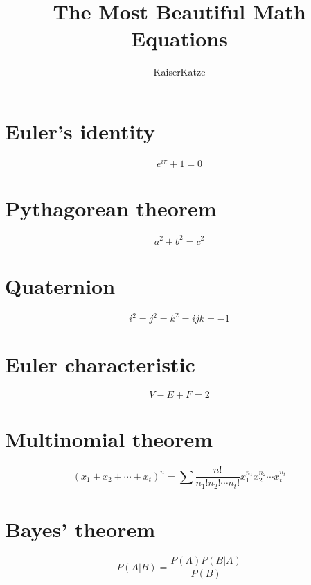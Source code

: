 \documentclass[12pt,twoside]{article}
\title{The Most Beautiful Math Equations}
\author{KaiserKatze}
\begin{document}

\maketitle

\section{Euler's identity}

$$ e^{i \pi} + 1 = 0 $$

\section{Pythagorean theorem}

$$ a^2 + b^2 = c^2 $$

\section{Quaternion}

$$ i^2 = j^2 = k^2 = ijk = -1 $$

\section{Euler characteristic}

$$ V - E + F = 2 $$

\section{Multinomial theorem}

$$ (x_1+x_2+\cdots+x_t)^n=\sum\frac{n!}{n_1!n_2!\cdots n_t!}x_1^{n_1}x_2^{n_2}\cdots x_t^{n_t} $$

\section{Bayes' theorem}

$$ P\left(A|B\right) = \frac{P\left(A\right)P\left(B|A\right)}{P\left(B\right)} $$
\end{document}
